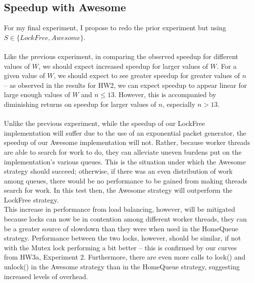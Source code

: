 \documentclass[]{article}
\begin{document}
\subsection{Speedup with Awesome}
For my final experiment, I propose to redo the prior experiment but using $S \in \{LockFree, Awesome\}$.
\\\\
Like the previous experiment, in comparing the observed speedup for different values of $W$, we should expect increased speedup for larger values of $W$. For a given value of $W$, we should expect to see greater speedup for greater values of $n$ -- as observed in the results for HW2, we can expect speedup to appear linear for large enough values of $W$ and $n \leq 13$. However, this is accompanied by diminishing returns on speedup for larger values of $n$, especially $n > 13$.
\\\\
Unlike the previous experiment, while the speedup of our LockFree implementation will suffer due to the use of an exponential packet generator, the speedup of our Awesome implementation  will not. Rather, because worker threads are able to search for work to do, they can alleviate uneven burdens put on the implementation's various queues. This is the situation under which the Awesome strategy should succeed; otherwise, if there was an even distribution of work among queues, there would be no performance to be gained from making threads search for work. In this test then, the Awesome strategy will outperform the LockFree strategy.
\\
This increase in performance from load balancing, however, will be mitigated because locks can now be in contention among different worker threads, they can be a greater source of slowdown than they were when used in the HomeQueue strategy. Performance between the two locks, however, should be similar, if not with the Mutex lock performing a bit better -- this is confirmed by our curves from HW3a, Experiment 2. Furthermore, there are even more calls to lock() and unlock() in the Awesome strategy than in the HomeQueue strategy, suggesting increased levels of overhead.
\end{document}

